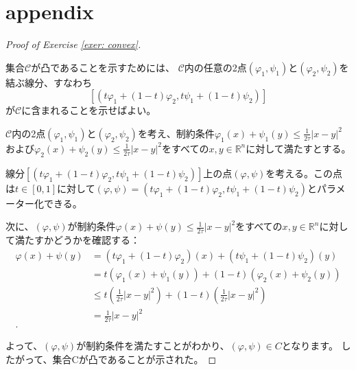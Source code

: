 \documentclass{jsarticle}
\theoremstyle{definition}
\begin{document}
\section{appendix}


\begin{proof}[Proof of Exercise \ref{exer: convex}]
  \label{proof:convex}

  集合$\mathcal{C}$が凸であることを示すためには、
  $\mathcal{C}$内の任意の2点\((\varphi_1, \psi_1)\)と\((\varphi_2, \psi_2)\)を結ぶ線分、すなわち
  \[
    [(t\varphi_1 + (1-t)\varphi_2, t\psi_1 + (1-t)\psi_2)]
  \]
  が$\mathcal{C}$に含まれることを示せばよい。

  $\mathcal{C}$内の2点\((\varphi_1, \psi_1)\)と\((\varphi_2, \psi_2)\)を考え、制約条件\(\varphi_1(x) + \psi_1(y) \leq \frac{1}{2\tau}|x - y|^2\)および\(\varphi_2(x) + \psi_2(y) \leq \frac{1}{2\tau}|x - y|^2\)をすべての\(x, y \in \mathbb{R}^n\)に対して満たすとする。

  線分\([(t\varphi_1 + (1-t)\varphi_2, t\psi_1 + (1-t)\psi_2)]\)上の点\((\varphi, \psi)\)を考える。この点は\(t \in [0, 1]\)に対して\((\varphi, \psi) = (t\varphi_1 + (1 - t)\varphi_2, t\psi_1 + (1 - t)\psi_2)\)とパラメーター化できる。

  次に、\((\varphi, \psi)\)が制約条件\(\varphi(x) + \psi(y) \leq \frac{1}{2\tau}|x - y|^2\)をすべての\(x, y \in \mathbb{R}^n\)に対して満たすかどうかを確認する：
  \begin{align*}
    \varphi(x) + \psi(y) &= (t\varphi_1 + (1 - t)\varphi_2)(x) + (t\psi_1 + (1 - t)\psi_2)(y)\\
                        &= t(\varphi_1(x) + \psi_1(y)) + (1 - t)(\varphi_2(x) + \psi_2(y))\\
                        &\leq t\left(\frac{1}{2\tau}|x - y|^2\right) + (1 - t)\left(\frac{1}{2\tau}|x - y|^2\right)\\
                        &= \frac{1}{2\tau}|x - y|^2\\.
  \end{align*}

  よって、\((\varphi, \psi)\)が制約条件を満たすことがわかり、\((\varphi, \psi) \in C\)となります。
  したがって、集合Cが凸であることが示された。
\end{proof}

\end{document}
